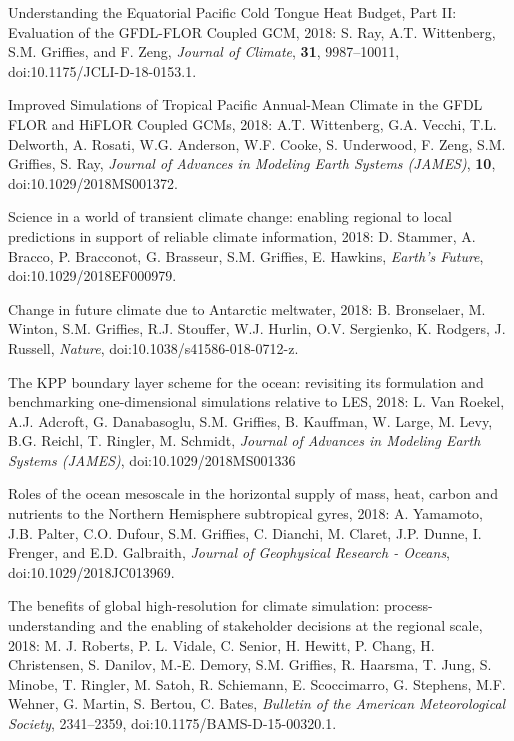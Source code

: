 \begin{etaremune}
\item Understanding the Equatorial Pacific Cold Tongue Heat Budget, Part II: Evaluation of the GFDL-FLOR Coupled GCM, 2018: S. Ray, A.T. Wittenberg, S.M. Grif\/f\/ies, and F. Zeng, {\it Journal of Climate}, {\bf 31}, 9987--10011, doi:10.1175/JCLI-D-18-0153.1.

\item Improved Simulations of Tropical Pacific Annual-Mean Climate in the GFDL FLOR and HiFLOR Coupled GCMs, 2018:  A.T. Wittenberg, G.A. Vecchi, T.L. Delworth, A. Rosati, W.G. Anderson, W.F. Cooke, S. Underwood, F. Zeng, S.M. Grif\/f\/ies, S. Ray, {\it Journal of Advances in Modeling Earth Systems (JAMES)}, {\bf 10}, doi:10.1029/2018MS001372. 

\item Science in a world of transient climate change: enabling regional to local predictions in support of reliable climate information, 2018: D. Stammer, A. Bracco, P. Bracconot, G. Brasseur, S.M. Grif\/f\/ies, E. Hawkins, {\it Earth's Future}, \\ doi:10.1029/2018EF000979.

\item Change in future climate due to Antarctic meltwater, 2018: B. Bronselaer, M. Winton, S.M. Grif\/f\/ies, R.J. Stouffer, W.J. Hurlin, O.V. Sergienko, K. Rodgers, J. Russell, {\it  Nature}, doi:10.1038/s41586-018-0712-z.

\item The KPP boundary layer scheme for the ocean: revisiting its formulation and benchmarking one-dimensional simulations relative to LES,  2018: L. Van Roekel, A.J.  Adcroft, G. Danabasoglu, S.M. Grif\/f\/ies, B. Kauffman, W. Large, M. Levy, B.G. Reichl, T. Ringler, M. Schmidt, {\it Journal of Advances in Modeling Earth Systems (JAMES)}, doi:10.1029/2018MS001336

\item Roles of the ocean mesoscale in the horizontal supply of mass, heat, carbon and nutrients to the Northern Hemisphere subtropical gyres, 2018: A. Yamamoto, J.B. Palter, C.O. Dufour, S.M. Grif\/f\/ies, C. Dianchi, M. Claret, J.P. Dunne, I. Frenger, and E.D. Galbraith, {\it Journal of Geophysical Research - Oceans},  doi:10.1029/2018JC013969.

\item The benefits of global high-resolution for climate simulation: process-understanding and the enabling of stakeholder decisions at the regional scale, 2018: M. J. Roberts, P. L. Vidale, C. Senior, H. Hewitt, P. Chang, H. Christensen, S. Danilov, M.-E. Demory, S.M. Grif\/f\/ies, R. Haarsma, T. Jung, S. Minobe, T. Ringler, M. Satoh, R. Schiemann, E. Scoccimarro, G. Stephens, M.F. Wehner, G. Martin, S. Bertou, C. Bates, {\it Bulletin of the American Meteorological Society}, 2341--2359, doi:10.1175/BAMS-D-15-00320.1. 


\end{etaremune}
